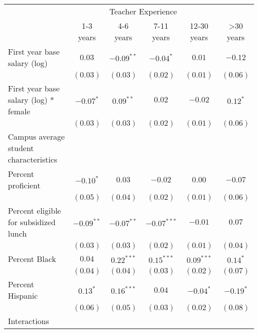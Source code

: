 \documentclass[12pt,]{article}
\begin{document}
\begin{sidewaystable}
\begin{center}
\begin{tabular}{l c c c c c }
\hline
 & \multicolumn{4}{c}{Teacher Experience} \\ \cline{2-6}
 & 1-3 years & 4-6 years & 7-11 years & 12-30 years & >30 years \\
\hline
First year base salary (log)                & $0.03$        & $-0.09^{**}$  & $-0.04^{*}$   & $0.01$       & $-0.12$     \\
                                            & $(0.03)$      & $(0.03)$      & $(0.02)$      & $(0.01)$     & $(0.06)$    \\
First year base salary (log) * female       & $-0.07^{*}$   & $0.09^{**}$   & $0.02$        & $-0.02$      & $0.12^{*}$  \\
                                            & $(0.03)$      & $(0.03)$      & $(0.02)$      & $(0.01)$     & $(0.06)$    \\
Campus average student characteristics      &               &               &               &              &             \\
\quad Percent proficient                    & $-0.10^{*}$   & $0.03$        & $-0.02$       & $0.00$       & $-0.07$     \\
                                            & $(0.05)$      & $(0.04)$      & $(0.02)$      & $(0.01)$     & $(0.06)$    \\
\quad Percent eligible for subsidized lunch & $-0.09^{**}$  & $-0.07^{**}$  & $-0.07^{***}$ & $-0.01$      & $0.07$      \\
                                            & $(0.03)$      & $(0.03)$      & $(0.02)$      & $(0.01)$     & $(0.04)$    \\
\quad Percent Black                         & $0.04$        & $0.22^{***}$  & $0.15^{***}$  & $0.09^{***}$ & $0.14^{*}$  \\
                                            & $(0.04)$      & $(0.04)$      & $(0.03)$      & $(0.02)$     & $(0.07)$    \\
\quad Percent Hispanic                      & $0.13^{*}$    & $0.16^{***}$  & $0.04$        & $-0.04^{*}$  & $-0.19^{*}$ \\
                                            & $(0.06)$      & $(0.05)$      & $(0.03)$      & $(0.02)$     & $(0.08)$    \\
Interactions                                &               &               &               &              &             \\

\end{tabular}
\end{center}
\end{sidewaystable}
\end{document}
